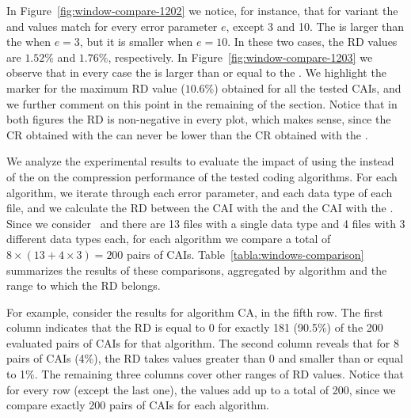 In Figure~\ref{fig:window-compare-1202} we notice, for instance, that for variant  the \ows and \lows values match for every error parameter $e$, except 3 and 10. The \ows is larger than the \lows when $e=3$, but it is smaller when $e=10$. In these two cases, the RD values are $1.52\%$ and $1.76\%$, respectively. In Figure~\ref{fig:window-compare-1203} we observe that in every case the \ows is larger than or equal to the \lows. We highlight the marker for the maximum RD value ($10.6\%$) obtained for all the tested CAIs, and we further comment on this point in the remaining of the section. Notice that in both figures the RD is non-negative in every plot, which makes sense, since the CR obtained with the \ows can never be lower than the CR obtained with the \lows.

\clearpage


\clearpage


We analyze the experimental results to evaluate the impact of using the \ows instead of the \lows on the compression performance of the tested coding algorithms. For each algorithm, we iterate through each error parameter, and each data type of each file, and we calculate the RD between the CAI with the \ows and the CAI with the \lows. Since we consider \errParVal\ and there are 13 files with a single data type and 4 files with 3 different data types each, for each algorithm we compare a total of $8 \times (13 + 4\times3) = 200$ pairs of CAIs. Table~\ref{tabla:windows-comparison} summarizes the results of these comparisons, aggregated by algorithm and the range to which the RD belongs. 


\vspace{+5pt}

\vspace{-5pt}


For example, consider the results for algorithm CA, in the fifth row. The first column indicates that the RD is equal to 0 for exactly 181 (90.5\%) of the 200 evaluated pairs of CAIs for that algorithm. The second column reveals that for 8 pairs of CAIs (4\%), the RD takes values greater than 0 and smaller than or equal to 1\%. The remaining three columns cover other ranges of RD values. Notice that for every row (except the last one), the values add up to a total of 200, since we compare exactly 200 pairs of CAIs for each algorithm.


